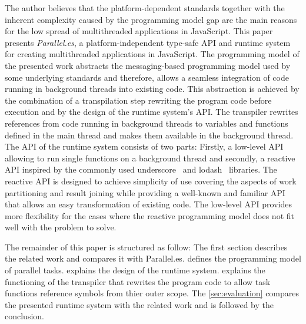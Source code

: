 The author believes that the platform-dependent standards together with the inherent complexity caused by the programming model gap are the main reasons for the low spread of multithreaded applications in JavaScript. This paper presents \textit{Parallel.es}, a platform-independent type-safe API and runtime system for creating multithreaded applications in JavaScript. The programming model of the presented work abstracts the messaging-based programming model used by some underlying standards and therefore, allows a seamless integration of code running in background threads into existing code. This abstraction is achieved by the combination of a transpilation step rewriting the program code before execution and by the design of the runtime system's API. The transpiler rewrites references from code running in background threads to variables and functions defined in the main thread and makes them available in the background thread. The API of the runtime system consists of two parts: Firstly, a low-level API allowing to run single functions on a background thread and secondly, a reactive API inspired by the commonly used underscore~\cite{underscorejs} and lodash~\cite{lodash} libraries. The reactive API is designed to achieve simplicity of use covering the aspects of work partitioning and result joining while providing a well-known and familiar API that allows an easy transformation of existing code. The low-level API provides more flexibility for the cases where the reactive programming model does not fit well with the problem to solve.


The remainder of this paper is structured as follow: The first section describes the related work and compares it with Parallel.es.  defines the programming model of parallel tasks.  explains the design of the runtime system.  explains the functioning of the transpiler that rewrites the program code to allow task functions reference symbols from thier outer scope. The \cref{sec:evaluation} compares the presented runtime system with the related work and is followed by the conclusion. 